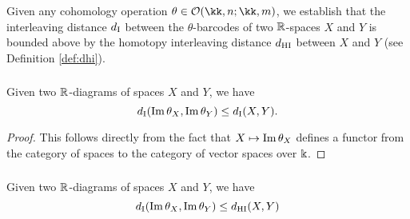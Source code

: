 Given any cohomology operation $\theta \in \cO(\kk, n; \kk, m)$, we establish that the interleaving distance $d_{\mathrm{I}}$ between the $\theta$-barcodes of two $\mathbb{R}$-spaces $X$ and $Y$ is bounded above by the homotopy interleaving distance $d_{\mathrm{HI}}$ between $X$ and $Y$ (see Definition \ref{def:dhi}).


\subsubsection{}\label{lem:di stability}

\lemma Given two $\mathbb{R}$-diagrams of spaces $X$ and $Y$, we have
\[
d_{\mathrm{I}}(\operatorname{Im}\theta_{X}, \operatorname{Im}\theta_{Y}) \leq d_{\mathrm{I}}(X,Y).
\]

\begin{proof}
	This follows directly from the fact that $X\mapsto \operatorname{Im}\theta_{X}$ defines a functor from the category of spaces to the category of vector spaces over $\Bbbk$.
\end{proof}

\subsubsection{}\label{thm:theta stability}

\theorem Given two $\mathbb{R}$-diagrams of spaces $X$ and $Y$, we have
\begin{equation}\label{eq:theta di-stability}
	d_{\mathrm{I}}(\operatorname{Im}\theta_{X}, \operatorname{Im}\theta_{Y})\leq d_{\mathrm{HI}}(X,Y)
\end{equation}

